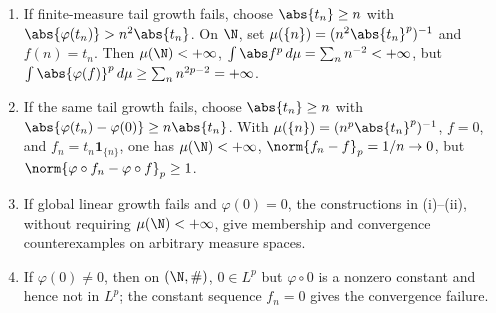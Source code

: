 \begin{method} \label{meth:composition-growth-counterexamples} 
\begin{enumerate}[label=(\roman*)]
\setlength{\itemsep}{0pt}
\item If finite-measure tail growth fails, choose $\abs{t_n}\geq n$ with $\abs{\varphi(t_n)}>n^2\abs{t_n}$. On $\N$, set $\mu(\{n\})=(n^2\abs{t_n}^p)^{-1}$ and $f(n)=t_n$. Then $\mu(\N)<+\infty$, $\int\abs f^p\,d\mu=\sum_n n^{-2}<+\infty$, but $\int\abs{\varphi(f)}^p\,d\mu\geq\sum_n n^{2p-2}=+\infty$.
\item If the same tail growth fails, choose $\abs{t_n}\geq n$ with $\abs{\varphi(t_n)-\varphi(0)}\geq n\abs{t_n}$. With $\mu(\{n\})=(n^p\abs{t_n}^p)^{-1}$, $f=0$, and $f_n=t_n\mathbf{1}_{\{n\}}$, one has $\mu(\N)<+\infty$, $\norm{f_n-f}_p=1/n\to0$, but $\norm{\varphi\circ f_n-\varphi\circ f}_p\geq1$.
\item If global linear growth fails and $\varphi(0)=0$, the constructions in (i)--(ii), without requiring $\mu(\N)<+\infty$, give membership and convergence counterexamples on arbitrary measure spaces.
\item If $\varphi(0)\neq0$, then on $(\N,\#)$, $0\in L^p$ but $\varphi\circ0$ is a nonzero constant and hence not in $L^p$; the constant sequence $f_n=0$ gives the convergence failure.
\end{enumerate}
\end{method}
